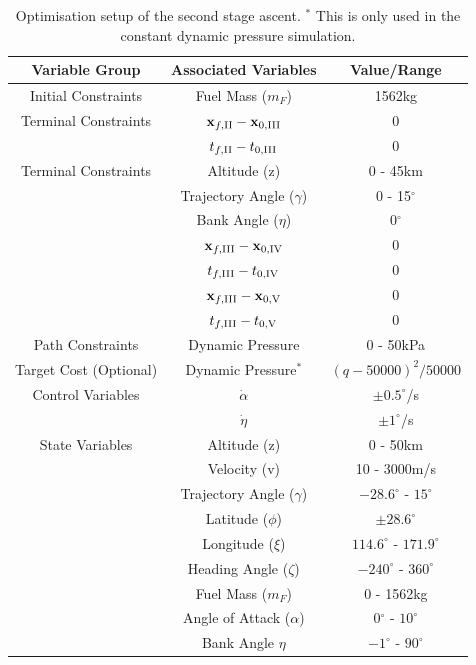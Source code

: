 \begin{table}[ht]
	\centering
	\begin{tabular}{|c|c|c|}
		\hline \textbf{Variable Group}  & \textbf{Associated Variables} & \textbf{Value/Range}\\
		\hline Initial Constraints  & Fuel Mass ($m_F$) & 1562kg\\ 
		Terminal Constraints & $\textbf{x}_{f,\textrm{\rom{2}}} - \textbf{x}_{0,\textrm{\rom{3}}}$ & 0\\ & $t_{f,\textrm{\rom{2}}} - t_{0,\textrm{\rom{3}}}$ & 0\\
		\hline Terminal Constraints & Altitude (z) & 0 - 45km\\ & Trajectory Angle ($\gamma$)& 0 - 15$^\circ$\\  & Bank Angle ($\eta$)& 0$^\circ$\\  & $\textbf{x}_{f,\textrm{\rom{3}}} - \textbf{x}_{0,\textrm{\rom{4}}}$ & 0\\ & $t_{f,\textrm{\rom{3}}} - t_{0,\textrm{\rom{4}}}$ & 0\\
		 & $\textbf{x}_{f,\textrm{\rom{3}}} - \textbf{x}_{0,\textrm{\rom{5}}}$ & 0\\ & $t_{f,\textrm{\rom{3}}} - t_{0,\textrm{\rom{5}}}$ & 0\\
		\hline Path Constraints & Dynamic Pressure& 0 - 50kPa\\ 
		\hline Target Cost (Optional) & Dynamic Pressure$^*$ & $(q-50000)^2/50000$\\ 
		\hline Control Variables & $\dot{\alpha}$ &  $\pm0.5^\circ$/s\\  & $\dot{\eta}$ &  $\pm1^\circ$/s\\ 
		\hline State Variables & Altitude (z) & 0 - 50km\\ & Velocity (v)& 10 - 3000m/s\\ & Trajectory Angle ($\gamma$)& $-28.6^\circ$ - $15^\circ$\\   & Latitude ($\phi$) &$\pm28.6^\circ$ \\  & Longitude ($\xi$)& $114.6^\circ$ - $171.9^\circ$\\   & Heading Angle ($\zeta$)& $-240^\circ$ - $360^\circ$ \\  & Fuel Mass ($m_F$)& 0 - 1562kg \\  & Angle of Attack ($\alpha$)&  0$^\circ$ - $10^\circ$ \\  & Bank Angle $\eta$& $-1^\circ$ - $90^\circ$ \\  
		\hline 
	\end{tabular} 
	\caption{Optimisation setup of the second stage ascent. $^*$ This is only used in the constant dynamic pressure simulation.}
	\label{tab:SPARTANascentsetup}
\end{table}

